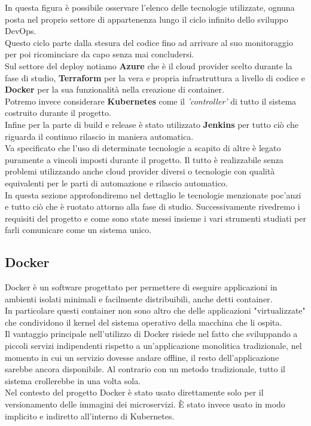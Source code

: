 \documentclass[a4paper,12pt]{report}
\begin{document}
In questa figura è possibile osservare l'elenco delle tecnologie utilizzate, ognuna posta nel proprio settore di appartenenza lungo il ciclo infinito dello sviluppo DevOps.\cite{devopsloop}\\
Questo ciclo parte dalla stesura del codice fino ad arrivare al suo monitoraggio per poi ricominciare da capo senza mai concludersi.\\
Sul settore del deploy notiamo \textbf{Azure} che è il cloud provider scelto durante la fase di studio, \textbf{Terraform} per la vera e propria infrastruttura a livello di codice e \textbf{Docker} per la sua funzionalità nella creazione di container.\\
Potremo invece considerare \textbf{Kubernetes}  come il \textit{'controller'} di tutto il sistema costruito durante il progetto.\\
Infine per la parte di build e release è stato utilizzato \textbf{Jenkins} per tutto ciò che riguarda il continuo rilascio in maniera automatica.\\
Va specificato che l'uso di determinate tecnologie a scapito di altre è legato puramente a vincoli imposti durante il progetto. Il tutto è realizzabile senza problemi utilizzando anche cloud provider diversi o tecnologie con qualità equivalenti per le parti di automazione e rilascio automatico.\\
In questa sezione approfondiremo nel dettaglio le tecnologie menzionate poc'anzi e tutto ciò che è ruotato attorno alla fase di studio. Successivamente rivedremo i requisiti del progetto e come sono state messi insieme i vari strumenti studiati per farli comunicare come un sistema unico.
\subsection{Docker}
Docker è un software progettato per permettere di eseguire applicazioni in ambienti isolati minimali e facilmente distribuibili, anche detti container. \cite{docker} \\
In particolare questi container non sono altro che delle applicazioni "virtualizzate" che condividono il kernel del sistema operativo della macchina che li ospita.\\
Il vantaggio principale nell'utilizzo di Docker risiede nel fatto che sviluppando a piccoli servizi indipendenti rispetto a un'applicazione monolitica tradizionale, nel momento in cui un servizio dovesse andare offline, il resto dell'applicazione sarebbe ancora disponibile. Al contrario con un metodo tradizionale, tutto il sistema crollerebbe in una volta sola.\\
Nel contesto del progetto Docker è stato usato direttamente solo per il versionamento delle immagini dei microservizi. È stato invece usato in modo implicito e indiretto all'interno di Kubernetes. \\ 
\end{document}
